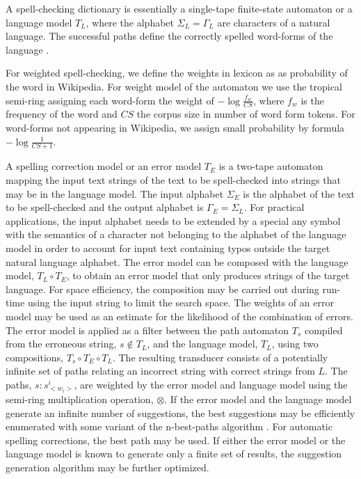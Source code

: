 \documentclass[a4paper,runningheads]{llncs}
\begin{document}
A spell-checking dictionary is essentially a single-tape finite-state
automaton or a language model $T_L$, where the alphabet $\Sigma_L =
\Gamma_L$ are characters of a natural language. The successful paths
define the correctly spelled word-forms of the language
\cite{conf/lrec/Pirinen2010}. 

For weighted spell-checking, we define the weights in lexicon as
as probability of the word in Wikipedia. For weight model of the automaton
we use the tropical semi-ring assigning each word-form the weight of
$-\log \frac{f_w}{CS}$, where $f_w$ is the frequency of the word and $CS$
the corpus size in number of word form tokens. For word-forms not appearing
in Wikipedia, we assign small probability by formula $-\log \frac{1}{CS+1}$.

A spelling correction model or an error model $T_E$ is a two-tape
automaton mapping the input text strings of the text to be
spell-checked into strings that may be in the language model. The
input alphabet $\Sigma_E$ is the alphabet of the text to be
spell-checked and the output alphabet is $\Gamma_E = \Sigma_L$. For
practical applications, the input alphabet needs to be extended by a
special any symbol with the semantics of a character not belonging to
the alphabet of the language model in order to account for input text
containing typos outside the target natural language alphabet. The
error model can be composed with the language model, $T_L \circ T_E$,
to obtain an error model that only produces strings of the target
language. For space efficiency, the composition may be carried out
during run-time using the input string to limit the search space. The
weights of an error model may be used as an estimate for the likelihood of the
combination of errors. The error model is applied as a filter between
the path automaton $T_s$ compiled from the erroneous string, $s \notin
T_L$, and the language model, $T_L$, using two compositions, $T_s
\circ T_E \circ T_L$. The resulting transducer consists of a
potentially infinite set of paths relating an incorrect string with
correct strings from $L$. The paths, $s:s^i_{<w_i>}$, are weighted by
the error model and language model using the semi-ring multiplication
operation, $\otimes$. If the error model and the language model
generate an infinite number of suggestions, the best suggestions may
be efficiently enumerated with some variant of the n-best-paths
algorithm \cite{mohri/2002}. For automatic spelling corrections, the
best path may be used. If either the error model or the language model
is known to generate only a finite set of results, the suggestion
generation algorithm may be further optimized.
\end{document}

